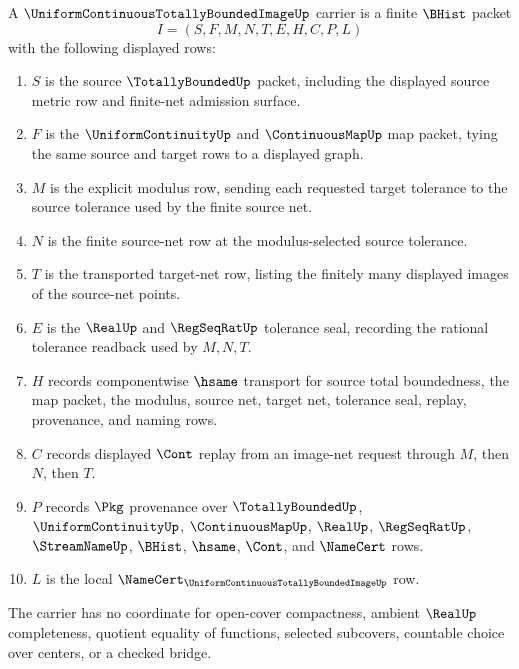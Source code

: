 \begin{definition}
\label{def:uniform-continuous-totally-bounded-image-carrier}
A $\UniformContinuousTotallyBoundedImageUp$ carrier is a finite $\BHist$ packet
$$
I=(S,F,M,N,T,E,H,C,P,L)
$$
with the following displayed rows:
\begin{enumerate}
\item $S$ is the source $\TotallyBoundedUp$ packet, including the displayed source metric row and finite-net admission surface.
\item $F$ is the $\UniformContinuityUp$ and $\ContinuousMapUp$ map packet, tying the same source and target rows to a displayed graph.
\item $M$ is the explicit modulus row, sending each requested target tolerance to the source tolerance used by the finite source net.
\item $N$ is the finite source-net row at the modulus-selected source tolerance.
\item $T$ is the transported target-net row, listing the finitely many displayed images of the source-net points.
\item $E$ is the $\RealUp$ and $\RegSeqRatUp$ tolerance seal, recording the rational tolerance readback used by $M,N,T$.
\item $H$ records componentwise $\hsame$ transport for source total boundedness, the map packet, the modulus, source net, target net, tolerance seal, replay, provenance, and naming rows.
\item $C$ records displayed $\Cont$ replay from an image-net request through $M$, then $N$, then $T$.
\item $P$ records $\Pkg$ provenance over $\TotallyBoundedUp$, $\UniformContinuityUp$, $\ContinuousMapUp$, $\RealUp$, $\RegSeqRatUp$, $\StreamNameUp$, $\BHist$, $\hsame$, $\Cont$, and $\NameCert$ rows.
\item $L$ is the local $\NameCert_{\UniformContinuousTotallyBoundedImageUp}$ row.
\end{enumerate}
The carrier has no coordinate for open-cover compactness, ambient $\RealUp$ completeness, quotient equality of functions, selected subcovers, countable choice over centers, or a checked bridge.
\end{definition}

